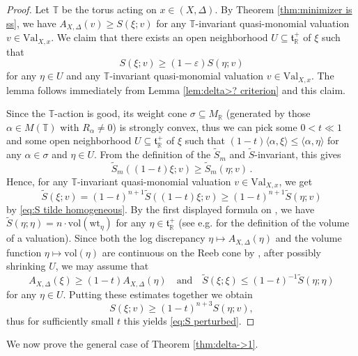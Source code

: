 \documentclass[12pt]{amsart}
\theoremstyle{definition}
\newcommand{\bR}{\mathbb{R}}
\newcommand{\bT}{\mathbb{T}}
\newcommand{\tS}{\widetilde{S}}
\newcommand{\ft}{\mathfrak{t}}
\newcommand{\vol}{\mathrm{vol}}
\newcommand{\Val}{\mathrm{Val}}
\newcommand{\wt}{\mathrm{wt}}
\numberwithin{equation}{section}
\begin{document}
\begin{proof}
Let $\bT$ be the torus acting on $x\in (X,\Delta)$. By Theorem \ref{thm:minimizer is ss}, we have $A_{X,\Delta}(v)\ge S(\xi;v)$ for any $\bT$-invariant quasi-monomial valuation $v\in \Val_{X,x}$. We claim that there exists an open neighborhood $U\subseteq \ft_\bR^+$ of $\xi$ such that 
\begin{equation} \label{eq:S perturbed}
S(\xi;v)\ge (1-\varepsilon)S(\eta;v)
\end{equation}
for any $\eta\in U$ and any $\bT$-invariant quasi-monomial valuation $v\in \Val_{X,x}$. The lemma follows immediately from Lemma \ref{lem:delta>? criterion} and this claim. 

Since the $\bT$-action is good, its weight cone $\sigma\subseteq M_\bR$ (generated by those $\alpha\in M(\bT)$ with $R_\alpha\neq 0$) is strongly convex, thus we can pick some $0<t\ll 1$ and some open neighborhood $U\subseteq \ft_\bR^+$ of $\xi$ such that $(1-t)\langle \alpha, \xi\rangle\le \langle \alpha, \eta\rangle$ for any $\alpha\in \sigma$ and $\eta\in U$. From the definition of the $\tS_m$ and $\tS$-invariant, this gives 
\[
\tS_m ((1-t)\xi;v)\ge \tS_m(\eta;v) \, .
\] 
Hence, for any $\bT$-invariant quasi-monomial valuation $v\in \Val_{X,x}$, we get
\[
\tS(\xi;v) = (1-t)^{n+1}\tS((1-t)\xi;v)\ge (1-t)^{n+1}\tS(\eta;v)
\]
by \eqref{eq:S tilde homogeneous}. By the first displayed formula on \cite[pp. 160]{XZ-uniqueness}, we have $\tS(\eta;\eta) = n\cdot \vol(\wt_\eta)$ for any $\eta\in \ft^+_\bR$ (see e.g. \cite[page 411]{ELS03} for the definition of the volume of a valuation). Since both the log discrepancy $\eta\mapsto A_{X,\Delta}(\eta)$ and the volume function $\eta\mapsto \vol(\eta)$ are continuous on the Reeb cone by \cite[Theorem 2.15(3) and Proposition 2.39]{LX-higher-rank}, after possibly shrinking $U$, we may assume that 
\[
A_{X,\Delta}(\xi)\ge (1-t)A_{X,\Delta}(\eta)\quad \mathrm{and}\quad \tS(\xi;\xi)\le (1-t)^{-1} \tS(\eta;\eta)
\]
for any $\eta\in U$. Putting these estimates together we obtain
\[
S(\xi;v) \ge (1-t)^{n+3} S(\eta;v),
\]
thus for sufficiently small $t$ this yields \eqref{eq:S perturbed}.
\end{proof}

We now prove the general case of Theorem \ref{thm:delta->1}.
\end{document}
